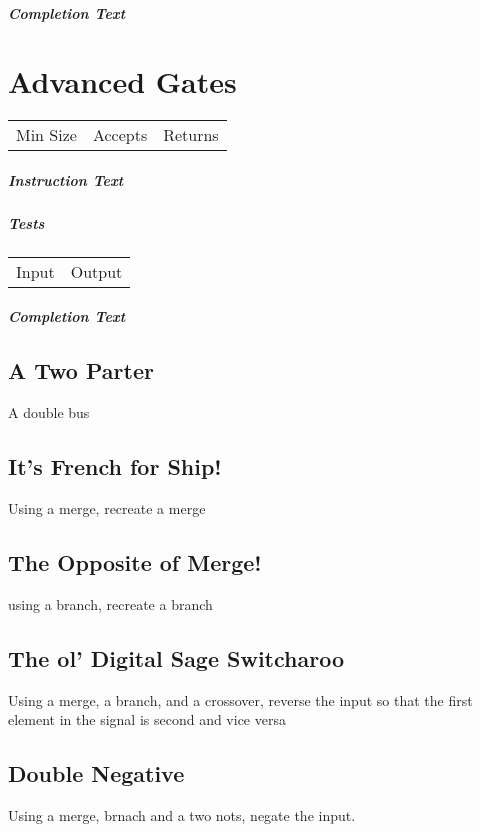 \documentclass[a4paper, 12pt]{article}
\begin{document}
\subparagraph{Completion Text}
\section{Advanced Gates}
\begin{tabular}{ccc}
	Min Size & Accepts & Returns \\
	
\end{tabular}

\subparagraph{Instruction Text}

\subparagraph{Tests}
\begin{tabular}{cc}
	Input & Output \\
\end{tabular}

\subparagraph{Completion Text}

\subsection{A Two Parter}
A double bus
\subsection{It's French for Ship!}
Using a merge, recreate a merge
\subsection{The Opposite of Merge!}
using a branch, recreate a branch
\subsection{The ol' Digital Sage Switcharoo}
Using a merge, a branch, and a crossover, reverse the input so that the first element in the signal is second and vice versa
\subsection{Double Negative}
Using a merge, brnach and a two nots, negate the input.
\end{document}

